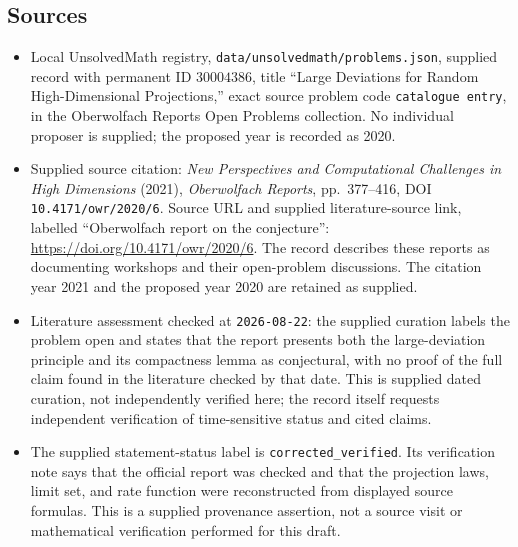 \documentclass[11pt]{article}
\begin{document}
\subsection{Sources}
\begin{itemize}
\item Local UnsolvedMath registry, \texttt{data/unsolvedmath/problems.json}, supplied record with permanent ID \(30004386\), title ``Large Deviations for Random High-Dimensional Projections,'' exact source problem code \texttt{catalogue entry}, in the Oberwolfach Reports Open Problems collection. No individual proposer is supplied; the proposed year is recorded as 2020.
\item Supplied source citation: \emph{New Perspectives and Computational Challenges in High Dimensions} (2021), \emph{Oberwolfach Reports}, pp.\ 377--416, DOI \texttt{10.4171/owr/2020/6}. Source URL and supplied literature-source link, labelled ``Oberwolfach report on the conjecture'': \url{https://doi.org/10.4171/owr/2020/6}. The record describes these reports as documenting workshops and their open-problem discussions. The citation year 2021 and the proposed year 2020 are retained as supplied.
\item Literature assessment checked at \texttt{2026-08-22}: the supplied curation labels the problem open and states that the report presents both the large-deviation principle and its compactness lemma as conjectural, with no proof of the full claim found in the literature checked by that date. This is supplied dated curation, not independently verified here; the record itself requests independent verification of time-sensitive status and cited claims.
\item The supplied statement-status label is \texttt{corrected\_verified}. Its verification note says that the official report was checked and that the projection laws, limit set, and rate function were reconstructed from displayed source formulas. This is a supplied provenance assertion, not a source visit or mathematical verification performed for this draft.
\end{itemize}
\end{document}
